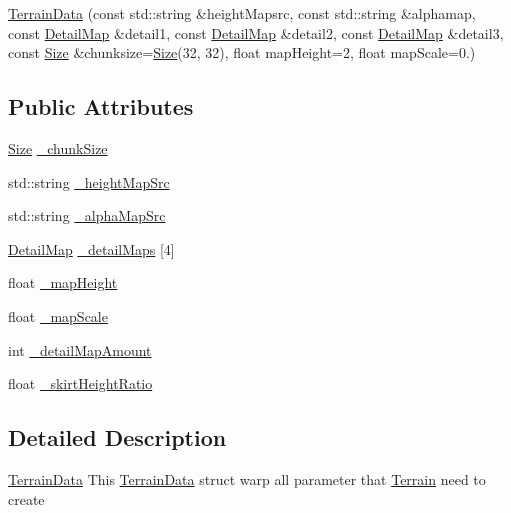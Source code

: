 \begin{DoxyCompactItemize}
\item 
\hyperlink{structTerrain_1_1TerrainData_ae57aa479b584a59c7dcd44266b91a024}{Terrain\+Data} (const std\+::string \&height\+Mapsrc, const std\+::string \&alphamap, const \hyperlink{structTerrain_1_1DetailMap}{Detail\+Map} \&detail1, const \hyperlink{structTerrain_1_1DetailMap}{Detail\+Map} \&detail2, const \hyperlink{structTerrain_1_1DetailMap}{Detail\+Map} \&detail3, const \hyperlink{classSize}{Size} \&chunksize=\hyperlink{classSize}{Size}(32, 32), float map\+Height=2, float map\+Scale=0.)
\end{DoxyCompactItemize}
\subsection*{Public Attributes}
\begin{DoxyCompactItemize}
\item 
\hyperlink{classSize}{Size} \hyperlink{structTerrain_1_1TerrainData_a39001d0acaa900f5b9909d1ad08103c2}{\+\_\+chunk\+Size}
\item 
std\+::string \hyperlink{structTerrain_1_1TerrainData_a32b46c6127661df1bb3f54fd8d31a0eb}{\+\_\+height\+Map\+Src}
\item 
std\+::string \hyperlink{structTerrain_1_1TerrainData_aa78b4f5e9270a45ab7ce0efed2eaddb7}{\+\_\+alpha\+Map\+Src}
\item 
\hyperlink{structTerrain_1_1DetailMap}{Detail\+Map} \hyperlink{structTerrain_1_1TerrainData_a47f33ceb6a82e697b3a66cf9b97050f9}{\+\_\+detail\+Maps} \mbox{[}4\mbox{]}
\item 
float \hyperlink{structTerrain_1_1TerrainData_aa062f5c344b3cdace22df156eeb3eac0}{\+\_\+map\+Height}
\item 
float \hyperlink{structTerrain_1_1TerrainData_aac82202e4b6af0dfe6de253c33286664}{\+\_\+map\+Scale}
\item 
int \hyperlink{structTerrain_1_1TerrainData_a926953528af6a2b75a063a25d0b53201}{\+\_\+detail\+Map\+Amount}
\item 
float \hyperlink{structTerrain_1_1TerrainData_ae0d8e147b63dacce35e10596750b458f}{\+\_\+skirt\+Height\+Ratio}
\end{DoxyCompactItemize}


\subsection{Detailed Description}
\hyperlink{structTerrain_1_1TerrainData}{Terrain\+Data} This \hyperlink{structTerrain_1_1TerrainData}{Terrain\+Data} struct warp all parameter that \hyperlink{classTerrain}{Terrain} need to create 

